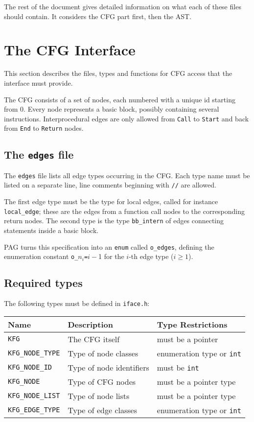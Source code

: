 \documentclass[12pt]{article}
\begin{document}
The rest of the document gives detailed information on what each of
these files should contain. It considers the CFG part first, then
the AST.

\section{The CFG Interface}

This section describes the files, types and functions for CFG access
that the interface must provide.

The CFG consists of a set of nodes, each numbered with a unique id
starting from 0. Every node represents a basic block, possibly
containing several instructions. Interprocedural edges are only
allowed from \verb|Call| to \verb|Start| and back from \verb|End| to
\verb|Return| nodes.

\subsection{The {\tt edges} file}

The \verb|edges| file lists all edge types occurring in the CFG.
Each type name must be listed on a separate line, line comments
beginning with \verb|//| are allowed.

The first edge type must be the type for local edges, called for
instance \verb|local_edge|; these are the edges from a function call
nodes to the corresponding return nodes. The second type is the type
\verb|bb_intern| of edges connecting statements inside a basic block.

PAG turns this specification into an \verb|enum| called
\verb|o_edges|, defining the enumeration constant
\verb|o_|\(n_i\)\verb|=|\(i-\)1 for the \(i\)-th edge type (\(i \ge 1\)).

\subsection{Required types}

The following types must be defined in \verb|iface.h|:

\begin{center}
\begin{tabular}{|l|l|l|}
\hline
Name                 & Description & Type Restrictions \\
\hline
\hline
\verb|KFG|           & The CFG itself
    & must be a pointer \\
\hline
\verb|KFG_NODE_TYPE| & Type of node classes
    & enumeration type or \verb|int| \\
\hline
\verb|KFG_NODE_ID|   & Type of node identifiers
    & must be \verb|int| \\
\hline
\verb|KFG_NODE|      & Type of CFG nodes
    & must be a pointer type \\
\hline
\verb|KFG_NODE_LIST| & Type of node lists
    & must be a pointer type \\
\hline
\verb|KFG_EDGE_TYPE| & Type of edge classes
    & enumeration type or \verb|int| \\
\hline
\end{tabular}
\end{center}
\end{document}
